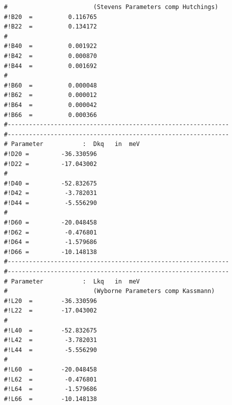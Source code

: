 \begin{enumerate}
{\begin{verbatim}
#                        (Stevens Parameters comp Hutchings)
#!B20  =          0.116765                                     
#!B22  =          0.134172                                     
#                                                              
#!B40  =          0.001922                                     
#!B42  =          0.000870                                     
#!B44  =          0.001692                                     
#                                                              
#!B60  =          0.000048                                     
#!B62  =          0.000012                                     
#!B64  =          0.000042                                     
#!B66  =          0.000366                                     
#-------------------------------------------------------------- 
#-------------------------------------------------------------- 
# Parameter           :  Dkq   in  meV                           
#!D20 =         -36.330596                                     
#!D22 =         -17.043002                                     
#                                                              
#!D40 =         -52.832675                                     
#!D42 =          -3.782031                                     
#!D44 =          -5.556290                                     
#                                                              
#!D60 =         -20.048458                                     
#!D62 =          -0.476801                                     
#!D64 =          -1.579686                                     
#!D66 =         -10.148138                                     
#-------------------------------------------------------------- 
#-------------------------------------------------------------- 
# Parameter           :  Lkq   in  meV                           
#                        (Wyborne Parameters comp Kassmann)
#!L20  =        -36.330596                                     
#!L22  =        -17.043002                                     
#                                                              
#!L40  =        -52.832675                                     
#!L42  =         -3.782031                                     
#!L44  =         -5.556290                                     
#                                                              
#!L60  =        -20.048458                                     
#!L62  =         -0.476801                                     
#!L64  =         -1.579686                                     
#!L66  =        -10.148138                                     

\end{verbatim}}
\end{enumerate}
